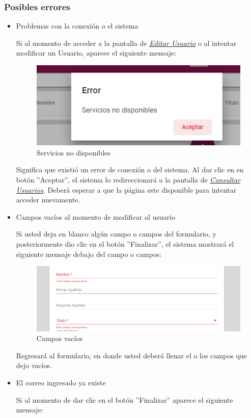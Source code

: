 \subsubsection{Posibles errores}
\begin{itemize}
	\item Problemas con la conexión o el sistema

	Si al momento de acceder a la pantalla de \hyperlink{editarUs}{\textit{Editar Usuario}} o al intentar modificar un Usuario, aparece el siguiente mensaje:
	\clearpage
	\begin{figure}[H]
		\centering
		\includegraphics[width=0.4\linewidth]{images/SP5/MSGSN}
		\caption{Servicios no disponibles}

	\end{figure}


	Significa que existió un error de conexión o del sistema. Al dar clic en en botón ''Aceptar'', el sistema lo redireccionará  a la pantalla de \hyperlink{consultarUs}{\textit{Consultar Usuarios}}. Deberá esperar a que la página este disponible para intentar acceder nuevamente.

	\item Campos vacíos al momento de modificar al usuario

	Si usted deja en blanco algún campo o campos del formulario, y posteriormente dio clic en el botón ''Finalizar'', el sistema mostrará el siguiente mensaje debajo del campo o campos:

	\begin{figure}[H]
		\centering
		\includegraphics[width=0.4\linewidth]{images/SP5/MSG44}
		\caption{Campos vacíos}
		\label{mensaje44}

	\end{figure}

	Regresará  al formulario, en donde usted deberá llenar el o los campos que dejo vacíos.
	\item El correo ingresado ya existe

	Si al momento de dar clic en el botón ''Finalizar'' aparece el siguiente mensaje:


\end{itemize}
